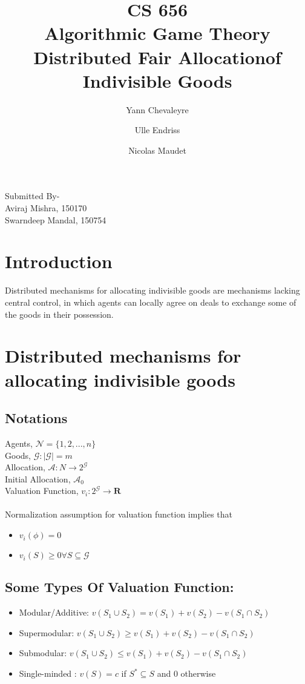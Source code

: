 \documentclass{article}
\title{CS 656 \\
	Algorithmic Game Theory \\
    Distributed Fair Allocationof Indivisible Goods	\\
	}
\author{Yann Chevaleyre \and
		Ulle Endriss \and
		 Nicolas Maudet
		}
\begin{document}
\vspace{3 cm}
\maketitle
\vspace{8 cm}
\begin{center}
\Large{Submitted By-\\
Aviraj Mishra, 150170\\
Swarndeep Mandal, 150754
}
\end{center}
\pagebreak
\large
\section{Introduction}
Distributed mechanisms for allocating indivisible goods are mechanisms lacking central control, in which agents can locally agree on deals to exchange some of the goods in their possession. 	

\section{Distributed mechanisms for allocating indivisible goods}
\subsection{Notations}
Agents, $\mathcal{N}=\{1,2,...,n\}$\\
Goods, $\mathcal{G} : |\mathcal{G}|=m$\\
Allocation, $\mathcal{A}:N \to 2^{\mathcal{G}}$\\
Initial Allocation, $\mathcal{A}_{0}$\\
Valuation Function, $v_{i}:2^{\mathcal{G}} \to \mathbf{R}$\\
\\
Normalization assumption for valuation function implies that 
\begin{itemize}
    \item $v_{i}(\phi)=0$
    \item $v_{i}(S) \geq 0 \forall S \subseteq \mathcal{G}$
\end{itemize}
\subsection{Some Types Of Valuation Function:}
\begin{itemize}
    \item Modular/Additive: $v(S_{1} \cup S_{2}) = v(S_{1}) + v(S_{2}) -v(S_{1} \cap S_{2}) $
    \item Supermodular: $v(S_{1} \cup S_{2}) \geq v(S_{1}) + v(S_{2}) -v(S_{1} \cap S_{2}) $
    \item Submodular: $v(S_{1} \cup S_{2}) \leq v(S_{1}) + v(S_{2}) -v(S_{1} \cap S_{2}) $
    \item Single-minded : $v(S) = c$ if $S^{*} \subseteq S $ and 0 otherwise
\end{itemize}
\end{document}
